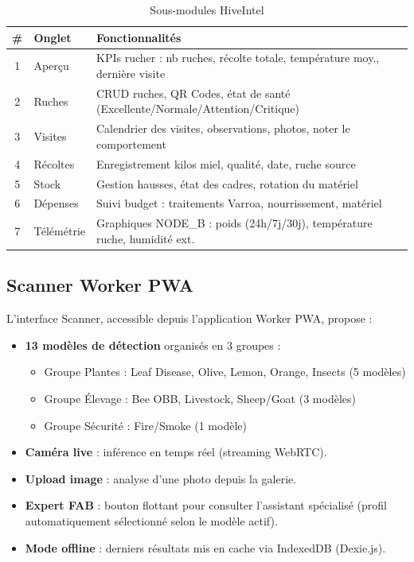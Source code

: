 \begin{table}[H]
\centering
\caption{Sous-modules HiveIntel}
\label{tab:hiveIntel}
\begin{tabular}{clp{8cm}}
\toprule
\textbf{\#} & \textbf{Onglet} & \textbf{Fonctionnalités} \\
\midrule
1 & Aperçu        & KPIs rucher : nb ruches, récolte totale, température moy., dernière visite \\
2 & Ruches        & CRUD ruches, QR Codes, état de santé (Excellente/Normale/Attention/Critique) \\
3 & Visites       & Calendrier des visites, observations, photos, noter le comportement \\
4 & Récoltes      & Enregistrement kilos miel, qualité, date, ruche source \\
5 & Stock         & Gestion hausses, état des cadres, rotation du matériel \\
6 & Dépenses      & Suivi budget : traitements Varroa, nourrissement, matériel \\
7 & Télémétrie    & Graphiques NODE\_B : poids (24h/7j/30j), température ruche, humidité ext. \\
\bottomrule
\end{tabular}
\end{table}

\subsection{Scanner Worker PWA}

L'interface Scanner, accessible depuis l'application Worker PWA, propose :

\begin{itemize}
  \item \textbf{13 modèles de détection} organisés en 3 groupes :
        \begin{itemize}
          \item Groupe Plantes : Leaf Disease, Olive, Lemon, Orange, Insects (5 modèles)
          \item Groupe Élevage : Bee OBB, Livestock, Sheep/Goat (3 modèles)
          \item Groupe Sécurité : Fire/Smoke (1 modèle)
        \end{itemize}
  \item \textbf{Caméra live} : inférence en temps réel (streaming WebRTC).
  \item \textbf{Upload image} : analyse d'une photo depuis la galerie.
  \item \textbf{Expert FAB} : bouton flottant pour consulter l'assistant spécialisé
        (profil automatiquement sélectionné selon le modèle actif).
  \item \textbf{Mode offline} : derniers résultats mis en cache via IndexedDB (Dexie.js).
\end{itemize}

